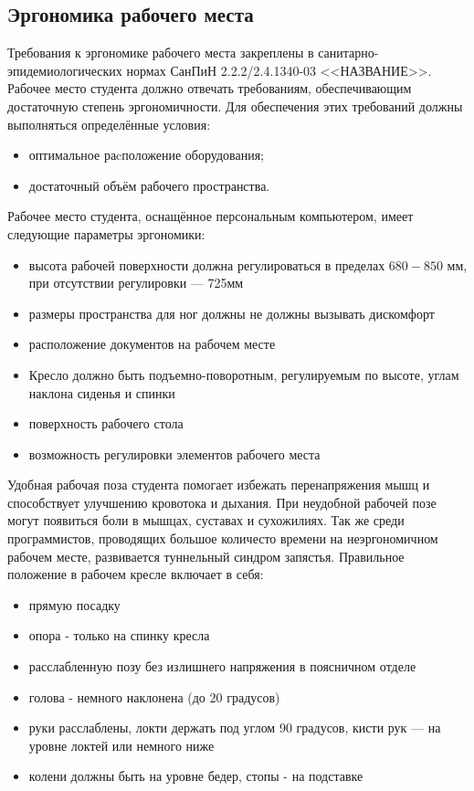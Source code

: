 \subsection{Эргономика рабочего места}

\label{erg}

Требования к эргономике рабочего места закреплены в санитарно-эпиде\-миологических нормах СанПиН 2.2.2/2.4.1340-03 <<НАЗВАНИЕ>>. Рабочее место студента должно отвечать требованиям, обеспечивающим достаточную степень эрго\-номичности. Для обеспечения этих требований должны выполняться опре\-делённые условия: 
\begin{itemize}
\item оптимальное раcположение оборудования;
\item достаточный объём рабочего пространства.
\end{itemize}

Рабочее место студента, оснащённое персональным компьютером, имеет следующие параметры эргономики: 
\begin{itemize}
\item высота рабочей поверхности должна регулироваться в пределах $680-850$ мм, при отсутствии регулировки — 725мм
\item размеры пространства для ног должны не должны вызывать диском\-форт
\item расположение документов на рабочем месте
\item Кресло должно быть подъемно-поворотным, регулируемым по высоте, углам наклона сиденья и спинки
\item поверхность рабочего стола
\item возможность регулировки элементов рабочего места
\end{itemize}

Удобная рабочая поза студента помогает избежать перенапряжения мышц и спо\-собствует улучшению кровотока и дыхания. При неудобной рабочей позе могут появиться боли в мышцах, суставах и сухожилиях. Так же среди программистов, проводящих большое количесто времени на неэргономичном рабочем месте, развивается туннельный синдром запястья.
Правильное по\-ложение в рабочем кресле включает в себя:
\begin{itemize}
\item прямую посадку
\item опора - только на спинку кресла
\item расслабленную позу без излишнего напряжения в поясничном отделе
\item голова  - немного наклонена (до 20 градусов)
\item руки расслаблены, локти держать под углом 90 градусов, кисти рук — на уровне локтей или немного ниже
\item колени должны быть на уровне бедер, стопы - на подставке
\end{itemize}


